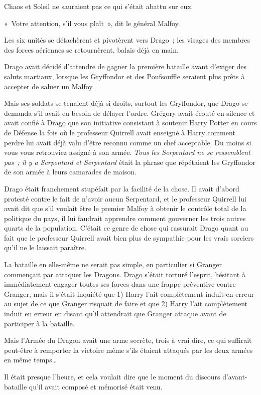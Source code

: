 Chaos et Soleil ne sauraient pas ce qui s'était abattu sur eux.

«~Votre attention, s'il vous plaît~», dit le général Malfoy.

Les six unités se détachèrent et pivotèrent vers Drago~; les visages des membres des forces aériennes se retournèrent, balais déjà en main.

Drago avait décidé d'attendre de gagner la première bataille avant d'exiger des saluts martiaux, lorsque les Gryffondor et des Poufsouffle seraient plus prêts à accepter de saluer un Malfoy.

Mais ses soldats se tenaient déjà si droits, surtout les Gryffondor, que Drago se demanda s'il avait eu besoin de délayer l'ordre. Grégory avait écouté en silence et avait confié à Drago que son initiative consistant à soutenir Harry Potter en cours de Défense la fois où le professeur Quirrell avait enseigné à Harry comment perdre lui avait déjà valu d'être reconnu comme un chef acceptable. Du moins si vous vous retrouviez assigné à son armée. \emph{Tous les Serpentard ne se ressemblent pas~; il y a Serpentard et Serpentard} était la phrase que répétaient les Gryffondor de son armée à leurs camarades de maison.

Drago était franchement stupéfait par la facilité de la chose. Il avait d'abord protesté contre le fait de n'avoir aucun Serpentard, et le professeur Quirrell lui avait dit que s'il voulait être le premier Malfoy à obtenir le contrôle total de la politique du pays, il lui faudrait apprendre comment gouverner les trois autres quarts de la population. C'était ce genre de chose qui rassurait Drago quant au fait que le professeur Quirrell avait bien plus de sympathie pour les vrais sorciers qu'il ne le laissait paraître.

La bataille en elle-même ne serait pas simple, en particulier si Granger commençait par attaquer les Dragons. Drago s'était torturé l'esprit, hésitant à immédiatement engager toutes ses forces dans une frappe préventive contre Granger, mais il s'était inquiété que 1) Harry l'ait complètement induit en erreur au sujet de ce que Granger risquait de faire et que 2) Harry l'ait complètement induit en erreur en disant qu'il attendrait que Granger attaque avant de participer à la bataille.

Mais l'Armée du Dragon avait une arme secrète, trois à vrai dire, ce qui suffirait peut-être à remporter la victoire même s'ils étaient attaqués par les deux armées en même temps…

Il était presque l'heure, et cela voulait dire que le moment du discours d'avant-bataille qu'il avait composé et mémorisé était venu.

